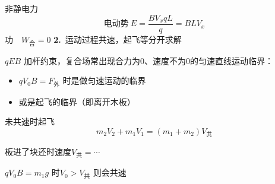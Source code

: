 非静电力
\[
\text{电动势}\ E=\frac{BV_xqL}{q}=BLV_x
\]
功　$W_{\text{合}}=0$
\textbf{2.}\ 运动过程共速，起飞等分开求解

$qEB$ 加杆约束，复合场常出现合力为0、速度不为0的匀速直线运动临界：
\begin{itemize}
\item $qV_0B=F_{\text{外}}$ 时是做匀速运动的临界
\item 或是起飞的临界（即离开木板）
\end{itemize}


未共速时起飞
\[
m_2V_2+m_1V_1=(m_1+m_2)V_{\text{共}}
\]

板进了块还时速度\quad $V_{\text{共}}=\cdots$

$qV_0B=m_1g$ 时\quad $V_0>V_{\text{共}}$ 则会共速

